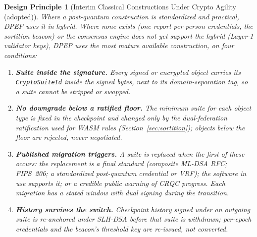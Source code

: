 \documentclass[10pt,twoside,openany]{book}
\theoremstyle{dpepstyle}
\newtheorem{designrule}{Design Principle}[chapter]
\begin{document}
\begin{designrule}[Interim Classical Constructions Under Crypto Agility (adopted)]
Where a post-quantum construction is standardized and practical, DPEP uses it in hybrid. Where none exists (one-report-per-person credentials, the sortition beacon) or the consensus engine does not yet support the hybrid (Layer-1 validator keys), DPEP uses the most mature available construction, on four conditions:
\begin{enumerate}[leftmargin=1.6em,itemsep=1pt]
  \item \textbf{Suite inside the signature.} Every signed or encrypted object carries its \texttt{CryptoSuiteId} inside the signed bytes, next to its domain-separation tag, so a suite cannot be stripped or swapped.
  \item \textbf{No downgrade below a ratified floor.} The minimum suite for each object type is fixed in the checkpoint and changed only by the dual-federation ratification used for WASM rules (Section~\ref{sec:sortition}); objects below the floor are rejected, never negotiated.
  \item \textbf{Published migration triggers.} A suite is replaced when the first of these occurs: the replacement is a final standard (composite ML-DSA RFC; FIPS~206; a standardized post-quantum credential or VRF); the software in use supports it; or a credible public warning of CRQC progress. Each migration has a stated window with dual signing during the transition.
  \item \textbf{History survives the switch.} Checkpoint history signed under an outgoing suite is re-anchored under SLH-DSA before that suite is withdrawn; per-epoch credentials and the beacon's threshold key are re-issued, not converted.
\end{enumerate}
\end{designrule}
\end{document}

